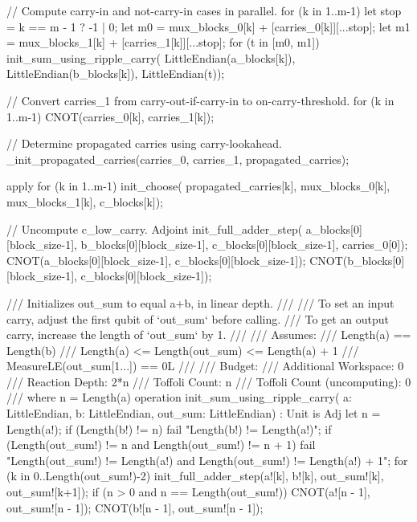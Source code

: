\documentclass[onecolumn,unpublished]{quantumarticle}
\theoremstyle{definition}
\theoremstyle{definition}
\theoremstyle{definition}
\begin{document}
\begin{qsharp}
{{{{                // Compute carry-in and not-carry-in cases in parallel.
                for (k in 1..m-1) {
                    let stop = k == m - 1 ? -1 | 0;
                    let m0 = mux_blocks_0[k] + [carries_0[k]][...stop];
                    let m1 = mux_blocks_1[k] + [carries_1[k]][...stop];
                    for (t in [m0, m1]) {
                        init_sum_using_ripple_carry(
                            LittleEndian(a_blocks[k]),
                            LittleEndian(b_blocks[k]),
                            LittleEndian(t));
                    }
                }
                
                // Convert carries_1 from carry-out-if-carry-in to on-carry-threshold.
                for (k in 1..m-1) {
                    CNOT(carries_0[k], carries_1[k]);
                }

                // Determine propagated carries using carry-lookahead.
                _init_propagated_carries(carries_0, carries_1, propagated_carries);
            } apply {
                for (k in 1..m-1) {
                    init_choose(
                        propagated_carries[k], 
                        mux_blocks_0[k], 
                        mux_blocks_1[k], 
                        c_blocks[k]);
                }
            }

            // Uncompute c_low_carry.
            Adjoint init_full_adder_step(
                a_blocks[0][block_size-1],
                b_blocks[0][block_size-1],
                c_blocks[0][block_size-1],
                carries_0[0]);
            CNOT(a_blocks[0][block_size-1], c_blocks[0][block_size-1]);
            CNOT(b_blocks[0][block_size-1], c_blocks[0][block_size-1]);
        }
    }

    /// Initializes out_sum to equal a+b, in linear depth.
    ///
    /// To set an input carry, adjust the first qubit of `out_sum` before calling.
    /// To get an output carry, increase the length of `out_sum` by 1.
    ///
    /// Assumes:
    ///     Length(a) == Length(b)
    ///     Length(a) <= Length(out_sum) <= Length(a) + 1
    ///     MeasureLE(out_sum[1...]) == 0L
    ///
    /// Budget:
    ///     Additional Workspace: 0
    ///     Reaction Depth: 2*n
    ///     Toffoli Count: n
    ///     Toffoli Count (uncomputing): 0
    ///     where n = Length(a)
    operation init_sum_using_ripple_carry(
            a: LittleEndian,
            b: LittleEndian,
            out_sum: LittleEndian) : Unit is Adj {
        let n = Length(a!);
        if (Length(b!) != n) {
            fail "Length(b!) != Length(a!)";
        }
        if (Length(out_sum!) != n and Length(out_sum!) != n + 1) {
            fail "Length(out_sum!) != Length(a!)
                and Length(out_sum!) != Length(a!) + 1";
        }
        for (k in 0..Length(out_sum!)-2) {
            init_full_adder_step(a![k], b![k], out_sum![k], out_sum![k+1]);
        }
        if (n > 0 and n == Length(out_sum!)) {
            CNOT(a![n - 1], out_sum![n - 1]);
            CNOT(b![n - 1], out_sum![n - 1]);
        }
    }

}
\end{qsharp}
\end{document}
